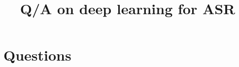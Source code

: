\documentclass[fleqn,10pt]{wlscirep}
\title{Q/A on deep learning for ASR}
\begin{document}
%
%
%

\section*{Questions}





\end{document}
